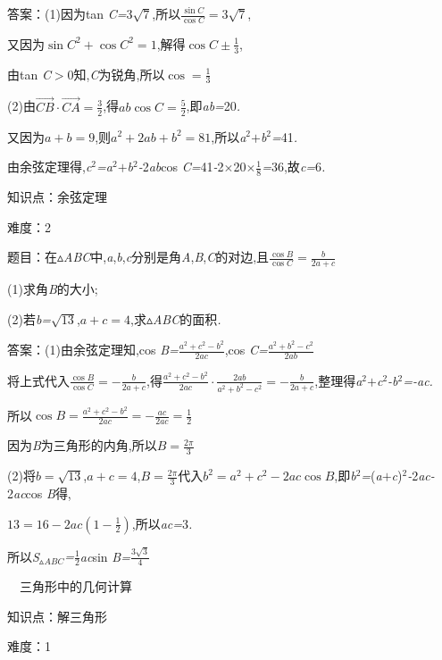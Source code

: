 \documentclass{article} %
\begin{document}
 答案：(1)因为tan \textit{C=}$3\sqrt{7}$,所以$\frac{\sin C}{\cos C}=3\sqrt{7}$,

又因为${\sin C}^2+{\cos C}^2=1$,解得$\cos C\pm\frac{1}{3}$,

由tan \textit{C$>$}0知,\textit{C}为锐角,所以$\cos=\frac{1}{3}$

(2)由$\vec{CB}\cdot\vec{CA}=\frac{3}{2}$,得$ab\cos C=\frac{5}{2}$,即\textit{ab=}20\textit{.}

又因为$a+b=9$,则$a^2+2ab+b^2=81$,所以\textit{a}${}^{2}$\textit{$+$b}${}^{2}$\textit{=}41\textit{.}

由余弦定理得,\textit{c}${}^{2}$\textit{=a}${}^{2}$\textit{$+$b}${}^{2}$\textit{-}2\textit{ab}cos \textit{C=}41\textit{-}2\textit{$\times$}20\textit{$\times$}$\frac{1}{8}$\textit{=}36,故\textit{c=}6\textit{.}

知识点：余弦定理

难度：2

 题目：在$\mathrm{\vartriangle}$\textit{ABC}中,\textit{a},\textit{b},\textit{c}分别是角\textit{A},\textit{B},\textit{C}的对边,且$\frac{\cos B}{\cos C}=\frac{b}{2a+c}$

 (1)求角\textit{B}的大小;

 (2)若\textit{b=}$\sqrt{13}$,$a+c=4$,求$\mathrm{\vartriangle}$\textit{ABC}的面积\textit{.}

 答案：(1)由余弦定理知,cos \textit{B=}$\frac{a^2+c^2-b^2}{2ac}$,cos \textit{C=}$\frac{a^2+b^2-c^2}{2ab}$

将上式代入$\frac{\cos B}{\cos C}=-\frac{b}{2a+c}$,得$\frac{a^2+c^2-b^2}{2ac}\cdot\frac{2ab}{a^2+b^2-c^2}=-\frac{b}{2a+c}$,整理得\textit{a}${}^{2}$\textit{$+$c}${}^{2}$\textit{-b}${}^{2}$\textit{=-ac.}

所以$\cos B=\frac{a^2+c^2-b^2}{2ac}=-\frac{ac}{2ac}=\frac{1}{2}$

因为\textit{B}为三角形的内角,所以$B=\frac{2\pi}{3}$

(2)将$b=\sqrt{13}$,$a+c=4$,$B=\frac{2\pi}{3}$代入$b^2=a^2+c^2-2ac\cos B$,即\textit{b}${}^{2}$\textit{=}(\textit{a$+$c})${}^{2}$\textit{-}2\textit{ac-}2\textit{ac}cos \textit{B}得,

$13=16-2ac(1-\frac{1}{2})$,所以\textit{ac=}3\textit{.}

所以\textit{S}${}_{\vartriangle }$\textit{${}_{ABC}$=}$\frac{1}{2}$\textit{ac}sin \textit{B=}$\frac{3\sqrt{3}}{4}$


 　三角形中的几何计算

知识点：解三角形

难度：1
\end{document}
